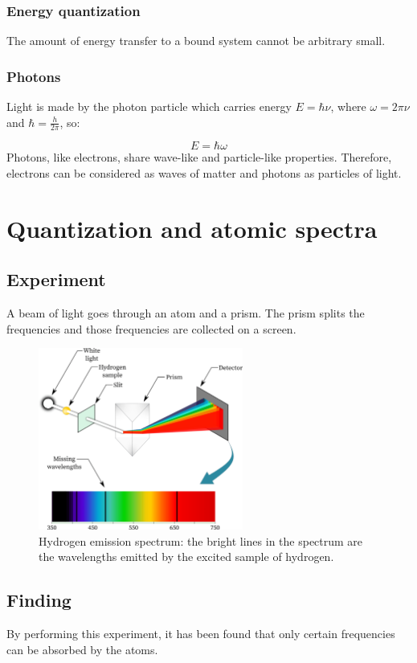     \subsubsection{Energy quantization}
    The amount of energy transfer to a bound system cannot be arbitrary small.

    \subsubsection{Photons}
    Light is made by the photon particle which carries energy $E = \hbar\nu$, where $\omega = 2\pi\nu$ and $\hbar = \frac{h}{2\pi}$, so:

    $$E = \hbar\omega$$
	\noindent
    Photons, like electrons, share wave-like and particle-like properties.
    Therefore, electrons can be considered as waves of matter and photons as particles of light.

\section{Quantization and atomic spectra}

  \subsection{Experiment}
  A beam of light goes through an atom and a prism.
  The prism splits the frequencies and those frequencies are collected on a screen.
\begin{figure}[h!]
    \centering
    \includegraphics[clip, width=0.6\textwidth]{quantization.png}
    \caption{\label{fig:quantization} Hydrogen emission spectrum: the bright lines in the spectrum are the wavelengths emitted by the excited sample of hydrogen.}
\end{figure}
  \subsection{Finding}
  By performing this experiment, it has been found that only certain frequencies can be absorbed by the atoms.

